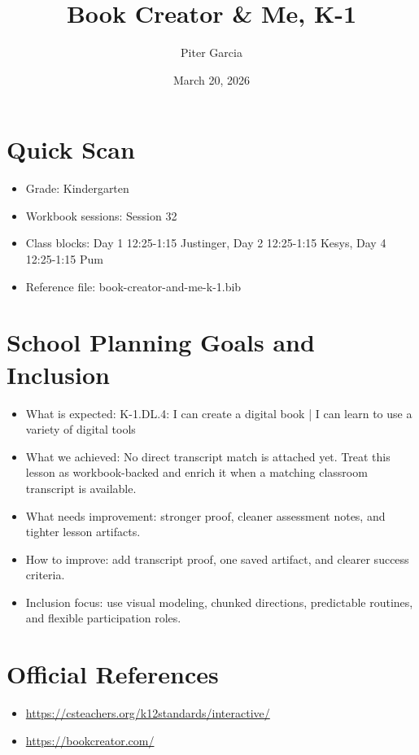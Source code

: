 \documentclass[11pt]{article}
\title{Book Creator & Me, K-1}
\author{Piter Garcia}
\date{March 20, 2026}
\begin{document}
    \maketitle
    \section*{Quick Scan}
    \begin{itemize}[leftmargin=*]
    \item Grade: Kindergarten
    \item Workbook sessions: Session 32
    \item Class blocks: Day 1 12:25-1:15 Justinger, Day 2 12:25-1:15 Kesys, Day 4 12:25-1:15 Pum
    \item Reference file: book-creator-and-me-k-1.bib
    \end{itemize}
    \section*{School Planning Goals and Inclusion}
    \begin{itemize}[leftmargin=*]
    \item What is expected: K-1.DL.4: I can create a digital book | I can learn to use a variety of digital tools
    \item What we achieved: No direct transcript match is attached yet. Treat this lesson as workbook-backed and enrich it when a matching classroom transcript is available.
    \item What needs improvement: stronger proof, cleaner assessment notes, and tighter lesson artifacts.
    \item How to improve: add transcript proof, one saved artifact, and clearer success criteria.
    \item Inclusion focus: use visual modeling, chunked directions, predictable routines, and flexible participation roles.
    \end{itemize}
    \section*{Official References}
    \begin{itemize}[leftmargin=*]
    \item \url{https://csteachers.org/k12standards/interactive/}
\item \url{https://bookcreator.com/}

    \end{itemize}
    
\end{document}
